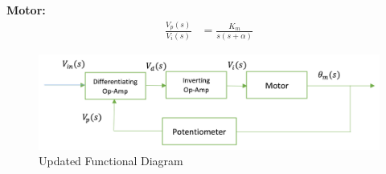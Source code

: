 \documentclass[11pt,a4paper]{article}
\begin{document}
\begin{enumerate}
    \textbf{Motor:}\\
    \begin{align*}
	\frac{V_{p}(s)}{V_{i}(s)} &= \frac{K_m}{s(s+\alpha)}
	\end{align*}

    \begin{figure}[H]
	\centering
	\includegraphics[width=.8\textwidth]{FigsC/c2c.png}
	\caption{\label{fig:c3}Updated Functional Diagram}
	\end{figure}

	
    

    
    
    
    
    
    
    
    

\end{enumerate}
\end{document}
